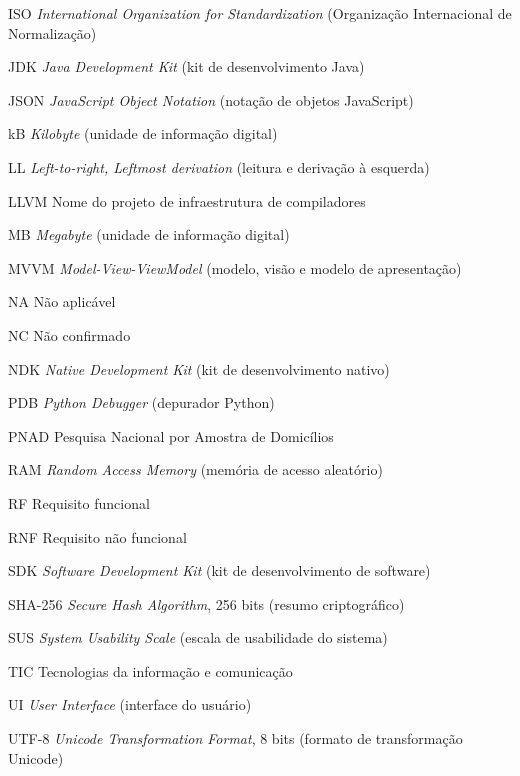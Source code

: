 \documentclass[
    12pt
    ,oneside
    ,a4paper
    ,chapter=TITLE
    ,section=TITLE
    ,sumario=abnt-6027-2012]{abntex2}
\begin{document}
\begin{siglas}
    \item[ISO] \textit{International Organization for Standardization} (Organização Internacional de Normalização)
    \item[JDK] \textit{Java Development Kit} (kit de desenvolvimento Java)
    \item[JSON] \textit{JavaScript Object Notation} (notação de objetos JavaScript)
    \item[kB] \textit{Kilobyte} (unidade de informação digital)
    \item[LL] \textit{Left-to-right, Leftmost derivation} (leitura e derivação à esquerda)
    \item[LLVM] Nome do projeto de infraestrutura de compiladores
    \item[MB] \textit{Megabyte} (unidade de informação digital)
    \item[MVVM] \textit{Model-View-ViewModel} (modelo, visão e modelo de apresentação)
    \item[NA] Não aplicável
    \item[NC] Não confirmado
    \item[NDK] \textit{Native Development Kit} (kit de desenvolvimento nativo)
    \item[PDB] \textit{Python Debugger} (depurador Python)
    \item[PNAD] Pesquisa Nacional por Amostra de Domicílios
    \item[RAM] \textit{Random Access Memory} (memória de acesso aleatório)
    \item[RF] Requisito funcional
    \item[RNF] Requisito não funcional
    \item[SDK] \textit{Software Development Kit} (kit de desenvolvimento de software)
    \item[SHA-256] \textit{Secure Hash Algorithm}, 256 bits (resumo criptográfico)
    \item[SUS] \textit{System Usability Scale} (escala de usabilidade do sistema)
    \item[TIC] Tecnologias da informação e comunicação
    \item[UI] \textit{User Interface} (interface do usuário)
    \item[UTF-8] \textit{Unicode Transformation Format}, 8 bits (formato de transformação Unicode)
\end{siglas}
\end{document}
